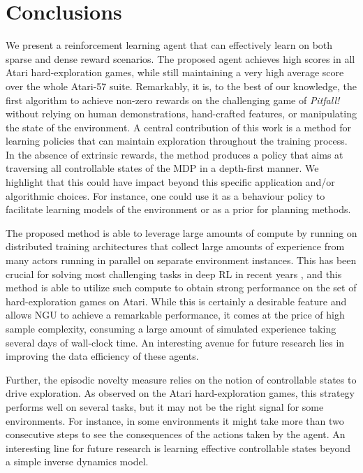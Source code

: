 \documentclass{article} %
\begin{document}
\section{Conclusions}
%
We present a reinforcement learning agent that can effectively learn on both sparse and dense reward scenarios.
The proposed agent achieves high scores in all Atari hard-exploration games, while still maintaining a very high average score over the whole Atari-57 suite. Remarkably, it is, to the best of our knowledge, the first algorithm to achieve non-zero rewards on the challenging game of \textit{Pitfall!} without relying on human demonstrations, hand-crafted features, or manipulating the state of the environment.
%
A central contribution of this work is a method for learning policies that can maintain exploration throughout the training process.
%
In the absence of extrinsic rewards, the method produces a policy that aims at traversing all controllable states of the MDP in a depth-first manner. We highlight that this could have impact beyond this specific application and/or algorithmic choices. For instance, one could use it as a behaviour policy to facilitate learning models of the environment or as a prior for planning methods.

The proposed method is able to leverage large amounts of compute by running on distributed training architectures that collect large amounts of experience from many actors running in parallel on separate environment instances. This has been crucial for solving most challenging tasks in deep RL in recent years \citep{andrychowicz2018learning, espeholt2018impala, silver2016mastering}, and this method is able to utilize such compute to obtain strong performance on the set of hard-exploration games on Atari.
%
While this is certainly a desirable feature and allows NGU to achieve a remarkable performance, it comes at the price of high sample
complexity, consuming a large amount of simulated experience taking several days of wall-clock time.
%
An interesting avenue for future research lies in improving the data efficiency of these agents.

Further, the episodic novelty measure relies on the notion of controllable states to drive exploration. As observed on the Atari hard-exploration games, this strategy performs well on several tasks, but it may not be the right signal for some environments. For instance, in some environments it might take more than two consecutive steps to see the consequences of the actions taken by the agent. An interesting line for future research is learning effective controllable states beyond a simple inverse dynamics model.
\end{document}

